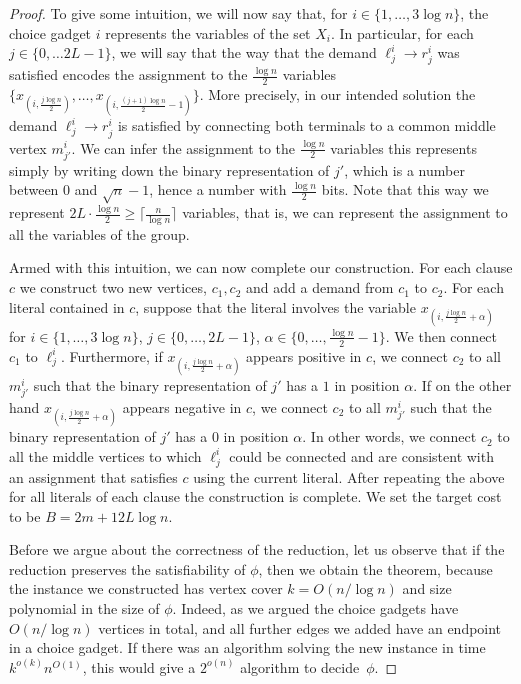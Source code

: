 \documentclass[a4paper]{article}
\theoremstyle{plain}
\begin{document}
\begin{proof}
To give some intuition, we will now say that, for $i\in\{1,\ldots, 3\log n\}$,
the choice gadget $i$ represents the variables of the set $X_i$. In particular,
for each $j\in\{0,\ldots 2L-1\}$, we will say that the way that the demand
$\ell^i_j\to r^i_j$ was satisfied encodes the assignment to the $\frac{\log
n}{2}$ variables $\{x_{(i,\frac{j\log n}{2})},\ldots,x_{(i,\frac{(j+1)\log
n}{2}-1)}\}$. More precisely, in our intended solution the demand $\ell^i_j\to
r^i_j$ is satisfied by connecting both terminals to a common middle vertex
$m^i_{j'}$. We can infer the assignment to the $\frac{\log n}{2}$ variables
this represents simply by writing down the binary representation of $j'$, which
is a number between $0$ and $\sqrt{n}-1$, hence a number with $\frac{\log
n}{2}$ bits. Note that this way we represent $2L \cdot \frac{\log n}{2}\ge
\lceil\frac{n}{\log n}\rceil$ variables, that is, we can represent the
assignment to all the variables of the group.

Armed with this intuition, we can now complete our construction. For each
clause $c$ we construct two new vertices, $c_1,c_2$ and add a demand from $c_1$
to $c_2$.  For each literal contained in $c$, suppose that the literal involves
the variable $x_{(i,\frac{j\log n}{2}+\alpha)}$ for $i\in\{1,\ldots,3\log n\}$,
$j\in \{0,\ldots,2L-1\}$, $\alpha\in\{0,\ldots,\frac{\log n}{2}-1\}$. We then
connect $c_1$ to $\ell^i_j$. Furthermore, if $x_{(i,\frac{j\log n}{2}+\alpha)}$
appears positive in $c$, we connect $c_2$ to all $m^i_{j'}$ such that the
binary representation of $j'$ has a $1$ in position $\alpha$. If on the other
hand $x_{(i,\frac{j\log n}{2}+\alpha)}$ appears negative in $c$, we connect
$c_2$ to all $m^i_{j'}$ such that the binary representation of $j'$ has a $0$
in position $\alpha$. In other words, we connect $c_2$ to all the middle
vertices to which $\ell^i_j$ could be connected and are consistent with an
assignment that satisfies $c$ using the current literal. After repeating the
above for all literals of each clause the construction is complete. We set the
target cost to be $B=2m+12L\log n$.

Before we argue about the correctness of the reduction, let us observe that if
the reduction preserves the satisfiability of $\phi$, then we obtain the
theorem, because the instance we constructed has vertex cover $k=O(n/\log n)$
and size polynomial in the size of $\phi$.  Indeed, as we argued the choice
gadgets have $O(n/\log n)$ vertices in total, and all further edges we added
have an endpoint in a choice gadget. If there was an algorithm solving the new
instance in time $k^{o(k)}n^{O(1)}$, this would give a $2^{o(n)}$ algorithm to
decide~$\phi$.


\end{proof}
\end{document}
